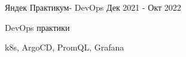 \begin{cventries}
  \cventry
    {} %
    {Яндек Практикум- DevOps} %
    {} %
    {Дек 2021 - Окт 2022} %
    {
      \begin{cvitems} %
        \item {DevOps практики}
        \item {k8s, ArgoCD, PromQL, Grafana}
        \end{cvitems}
    }
%
%
\end{cventries}
